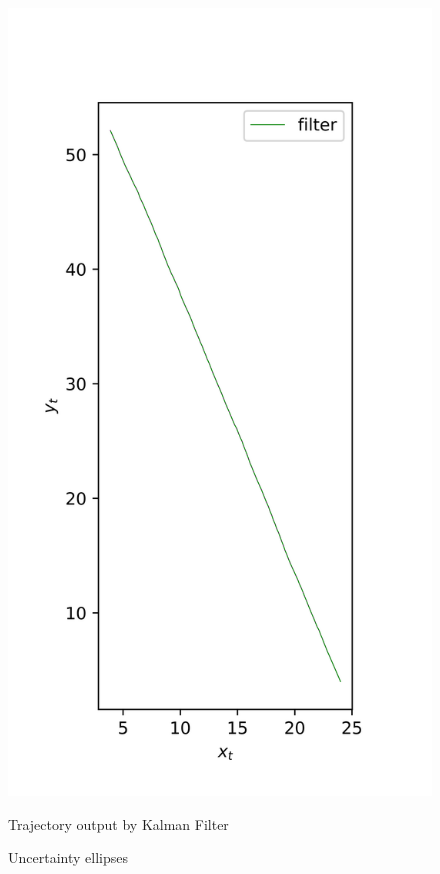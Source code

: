 \begin{figure}[H]
\begin{minipage}{0.32\linewidth}
        \includegraphics[width=1.2\linewidth]{plots/part2-e-filter.png}
        \caption*{Trajectory output by Kalman Filter}
    \end{minipage}
    \caption{Uncertainty ellipses}
    \label{fig:uncertainty-ellipses}
\end{figure}



